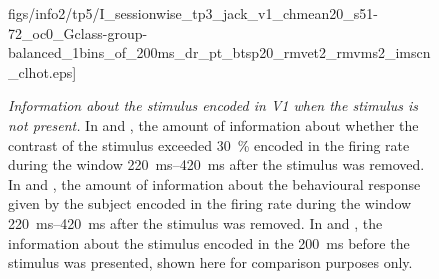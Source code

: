 \begin{figure}[htbp]
{{figs/info2/tp5/I\_sessionwise\_tp3\_jack\_v1\_chmean20\_s51-72\_oc0\_Gclass-group-balanced\_1bins\_of\_200ms\_dr\_pt\_btsp20\_rmvet2\_rmvms2\_imscn\_clhot.eps]}}
    \hspace*{\fill}
    \caption{\textit{Information about the stimulus encoded in \ac{V1} when the stimulus is not present.}
In \protect{} and \protect{}, the amount of information about whether the contrast of the stimulus exceeded \SI{30}{\percent} encoded in the firing rate during the window \SIrange{220}{420}{\milli\second} after the stimulus was removed.
In \protect{} and \protect{}, the amount of information about the behavioural response given by the subject encoded in the firing rate during the window \SIrange{220}{420}{\milli\second} after the stimulus was removed.
In \protect{} and \protect{}, the information about the stimulus encoded in the \SI{200}{\milli\second} before the stimulus was presented, shown here for comparison purposes only.
    \label{fig:info_tp5_v1}
}
\end{figure}


